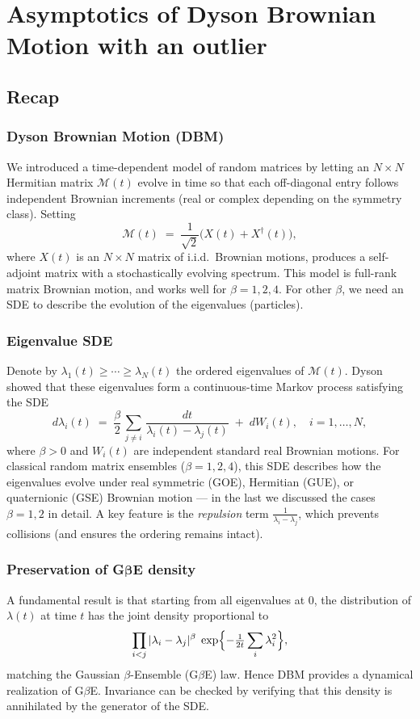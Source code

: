 \documentclass[letterpaper,11pt,oneside,reqno]{book}
\numberwithin{equation}{chapter}  %
\theoremstyle{definition}
\begin{document}
\chapter{Asymptotics of Dyson Brownian Motion with an outlier}
\label{chap:lecture11}




\section{Recap}

\subsection{Dyson Brownian Motion (DBM)}
We introduced a time-dependent model of random matrices by letting an
\(N\times N\) Hermitian matrix \(\mathcal{M}(t)\) evolve in time so that each
off-diagonal entry follows independent Brownian increments (real or complex
depending on the symmetry class).  Setting
\[
\mathcal{M}(t) \;=\; \frac{1}{\sqrt{2}}\bigl(X(t) + X^\dagger(t)\bigr),
\]
where \(X(t)\) is an \(N\times N\) matrix of i.i.d.\ Brownian motions,
produces a self-adjoint matrix with a stochastically evolving spectrum.
This model is full-rank matrix Brownian motion,
and works well for $\beta=1,2,4$.
For other $\beta$, we need an SDE to describe the evolution of the eigenvalues (particles).

\subsection{Eigenvalue SDE}
Denote by \(\lambda_1(t)\ge\cdots\ge\lambda_N(t)\) the ordered eigenvalues of
\(\mathcal{M}(t)\).  Dyson showed that these eigenvalues form a
continuous-time Markov process satisfying the SDE
\[
d\lambda_i(t)
\;=\;
\frac{\beta}{2}\,\sum_{j\neq i}\,\frac{dt}{\lambda_i(t)-\lambda_j(t)}
\;+\;
dW_i(t),
\quad
i=1,\dots,N,
\]
where \(\beta>0\) and \(W_i(t)\) are independent standard real Brownian motions.
For classical random matrix ensembles (\(\beta=1,2,4\)), this SDE describes how
the eigenvalues evolve under real symmetric (GOE), Hermitian (GUE), or
quaternionic (GSE) Brownian motion --- in the last  we discussed the cases \(\beta=1,2\) in detail.
A key feature is the \emph{repulsion} term
\(\frac{1}{\lambda_i-\lambda_j}\), which prevents collisions (and ensures the
ordering remains intact).

\subsection{Preservation of G\(\boldsymbol{\beta}\)E density}
A fundamental result is that starting from all eigenvalues at \(0\),
the distribution of \(\lambda(t)\) at time \(t\) has the joint density
proportional to
\[
\prod_{i<j}|\lambda_i - \lambda_j|^\beta\;
\exp\Bigl\{-\tfrac{1}{2t}\sum_i \lambda_i^2\Bigr\},
\]
matching the Gaussian \(\beta\)-Ensemble (G\(\beta\)E) law.  Hence DBM provides
a dynamical realization of G\(\beta\)E.  Invariance can be checked by verifying
that this density is annihilated by the generator of the SDE.
\end{document}
